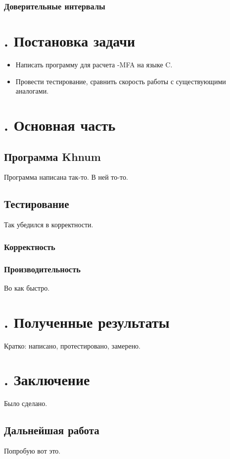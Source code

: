 \documentclass[14pt, a4paper]{extreport}
\newcommand{\CC}{C\nolinebreak\hspace{-.05em}\raisebox{.4ex}{\tiny\bf +}\nolinebreak\hspace{-.10em}\raisebox{.4ex}{\tiny\bf +}}
\def\CC{{C\nolinebreak[4]\hspace{-.05em}\raisebox{.4ex}{\tiny\bf ++}}} %
\begin{document}
\subsection{Доверительные интервалы}

\chapter[Постановка задачи]{\thechapter{}. Постановка задачи}
\begin{itemize}
	\item Написать программу для расчета -MFA на языке \CC.
	\item Провести тестирование, сравнить скорость работы с существующими аналогами.
\end{itemize}

\chapter[Основная часть]{\thechapter{}. Основная часть}
\section{Программа Khnum}
Программа написана так-то. В ней то-то. 

\section{Тестирование}
Так убедился в корректности.

\subsection{Корректность}

\subsection{Производительность}
Во как быстро.

\chapter[Полученные результаты]{\thechapter{}. Полученные результаты}
Кратко: написано, протестировано, замерено.

\chapter[Заключение]{\thechapter{}. Заключение}
Было сделано. 
\section{Дальнейшая работа}
Попробую вот это.
\end{document}
